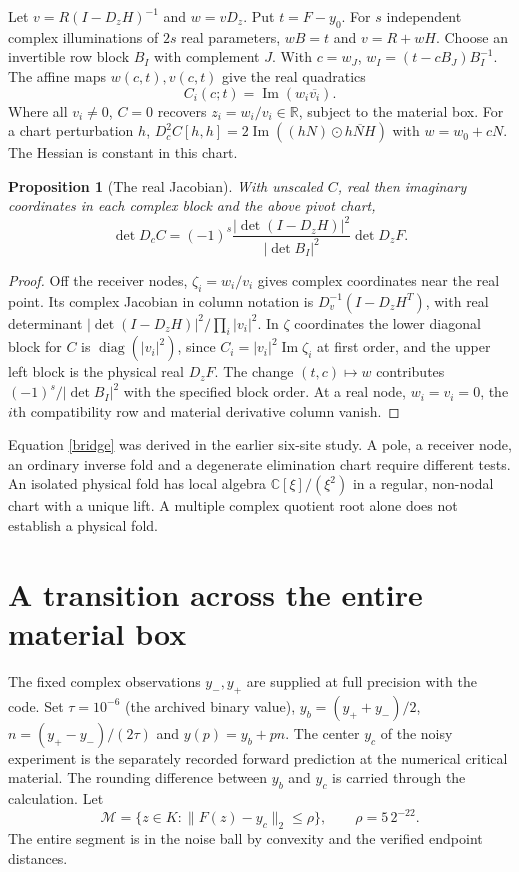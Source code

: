 \documentclass[10pt]{article}
\newtheorem{proposition}{Proposition}
\newcommand{\diag}{\operatorname{diag}}
\newcommand{\RR}{\mathbb R}
\newcommand{\CC}{\mathbb C}
\begin{document}
Let $v=R(I-D_zH)^{-1}$ and $w=v D_z$. Put $t=F-y_0$. For $s$ independent complex illuminations of $2s$ real parameters, $wB=t$ and $v=R+wH$. Choose an invertible row block $B_I$ with complement $J$. With $c=w_J$, $w_I=(t-cB_J)B_I^{-1}$. The affine maps $w(c,t),v(c,t)$ give the real quadratics
\[
                 C_i(c;t)=\operatorname{Im}(w_i\overline{v_i}).
\]
Where all $v_i\ne0$, $C=0$ recovers $z_i=w_i/v_i\in\RR$, subject to the material box. For a chart perturbation $h$, $D^2_cC[h,h]=2\operatorname{Im}((hN)\odot\overline{hNH})$ with $w=w_0+cN$. The Hessian is constant in this chart.

\begin{proposition}[The real Jacobian]\label{jac}
With unscaled $C$, real then imaginary coordinates in each complex block and the above pivot chart,
\begin{equation}
 \det D_cC=(-1)^s \frac{|\det(I-D_zH)|^2}{|\det B_I|^2}\det D_zF. \label{bridge}
\end{equation}
\end{proposition}
\begin{proof}
Off the receiver nodes, $\zeta_i=w_i/v_i$ gives complex coordinates near the real point. Its complex Jacobian in column notation is $D_v^{-1}(I-D_zH^T)$, with real determinant $|\det(I-D_zH)|^2/\prod_i|v_i|^2$. In $\zeta$ coordinates the lower diagonal block for $C$ is $\diag(|v_i|^2)$, since $C_i=|v_i|^2\operatorname{Im}\zeta_i$ at first order, and the upper left block is the physical real $D_zF$. The change $(t,c)\mapsto w$ contributes $(-1)^s/|\det B_I|^2$ with the specified block order. At a real node, $w_i=v_i=0$, the $i$th compatibility row and material derivative column vanish.
\end{proof}
Equation \eqref{bridge} was derived in the earlier six-site study. A pole, a receiver node, an ordinary inverse fold and a degenerate elimination chart require different tests. An isolated physical fold has local algebra $\CC[\xi]/(\xi^2)$ in a regular, non-nodal chart with a unique lift. A multiple complex quotient root alone does not establish a physical fold.
\section{A transition across the entire material box}
The fixed complex observations $y_-,y_+$ are supplied at full precision with the code. Set $\tau=10^{-6}$ (the archived binary value), $y_b=(y_++y_-)/2$, $n=(y_+-y_-)/(2\tau)$ and $y(p)=y_b+pn$. The center $y_c$ of the noisy experiment is the separately recorded forward prediction at the numerical critical material. The rounding difference between $y_b$ and $y_c$ is carried through the calculation. Let
\[
 \mathcal M=\{z\in K:\|F(z)-y_c\|_2\le \rho\},\qquad \rho=5\,2^{-22}.
\]
The entire segment is in the noise ball by convexity and the verified endpoint distances.
\end{document}
